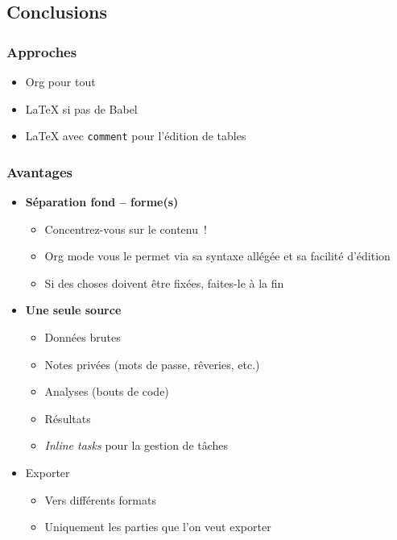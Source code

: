 \documentclass[presentation,t,hideothersubsections]{beamer}
\begin{document}
\subsection{Conclusions}
\label{sec-7-1}
\begin{frame}
\frametitle{Approches}
\label{sec-7-1-1}


\begin{itemize}
\item Org pour tout
\item \LaTeX{} si pas de Babel
\item \LaTeX{} avec \texttt{comment} pour l'édition de tables
\end{itemize}
\end{frame}
\begin{frame}
\frametitle{Avantages}
\label{sec-7-1-2}


\begin{itemize}
\item \textbf{Séparation fond -- forme(s)}
\begin{itemize}
\item Concentrez-vous sur le contenu !
\item Org mode vous le permet via sa syntaxe allégée et sa facilité d'édition
\item Si des choses doivent être fixées, faites-le à la fin
\end{itemize}
\item \textbf{Une seule source}
\begin{itemize}
\item Données brutes
\item Notes privées (mots de passe, rêveries, etc.)
\item Analyses (bouts de code)
\item Résultats
\item \emph{Inline tasks} pour la gestion de tâches
\end{itemize}
\item Exporter
\begin{itemize}
\item Vers différents formats
\item Uniquement les parties que l'on veut exporter
\end{itemize}
\end{itemize}
\end{frame}
\end{document}
